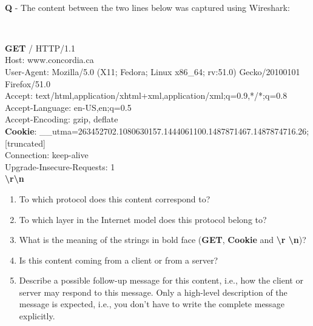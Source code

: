 \documentclass{llncs}
\newcounter{ques}
\renewcommand{\question}[1]{\paragraph{}\textbf{Q\theques} - #1\stepcounter{ques} }
\newcommand{\answer}[1]{}%
\begin{document}
\answer{See slide 30 in Chapter 1.
  The probability that exactly $i$ users are active simultaneously is:
  \begin{equation*}
    p_i = \binom{N}{i} p^i(1-p)^{(N-i)}
  \end{equation*}
  It gives:
  \begin{equation*}
    p_2 = 55.0.15^2.(1-0.15)^{11-2}
  \end{equation*}
  \begin{equation*}
    p_2 = 0.29
  \end{equation*}
}

\newpage




\question{The content between the two lines below was captured using
  Wireshark:
  
\noindent \hrulefill\\
\begin{small}
\textbf{GET} / HTTP/1.1 \\
Host: www.concordia.ca\\
User-Agent: Mozilla/5.0 (X11; Fedora; Linux x86\_64; rv:51.0) Gecko/20100101 Firefox/51.0\\
Accept: text/html,application/xhtml+xml,application/xml;q=0.9,*/*;q=0.8\\
Accept-Language: en-US,en;q=0.5\\
Accept-Encoding: gzip, deflate\\
\textbf{Cookie}: \_\_utma=263452702.1080630157.1444061100.1487871467.1487874716.26;  [truncated]\\
Connection: keep-alive\\
Upgrade-Insecure-Requests: 1\\
\textbf{\textbackslash r\textbackslash n}\\
\vspace*{-0.3cm}
\hrulefill

\end{small}
\begin{enumerate}
\item To which protocol does this content correspond to?
\item To which layer in the Internet model does this protocol belong to?
\item What is the meaning of the strings in bold face (\textbf{GET}, \textbf{Cookie} and \textbf{\textbackslash r \textbackslash n})? 
\item Is this content coming from a client or from a server?
\item Describe a possible follow-up message for this content, i.e.,
  how the client or server may respond to this message. Only a
  high-level description of the message is expected, i.e., you don't
  have to write the complete message explicitly.
\end{enumerate}
}
\end{document}
